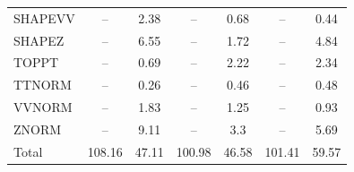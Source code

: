 \begin{table}[H]
\begin{center}
\begin{footnotesize}
\begin{tabular}{lcccccc}
				SHAPEVV & -- &  2.38 & -- &  0.68 & -- &  0.44 \\
				SHAPEZ & -- &  6.55 & -- &  1.72 & -- &  4.84 \\
				TOPPT & -- &  0.69 & -- &  2.22 & -- &  2.34 \\
				TTNORM & -- &  0.26 & -- &  0.46 & -- &  0.48 \\
				VVNORM & -- &  1.83 & -- &  1.25 & -- &  0.93 \\
				ZNORM & -- &  9.11 & -- &  3.3 & -- &  5.69 \\
				Total &  108.16  &  47.11 &  100.98  &  46.58 &  101.41  &  59.57 \\ \hline \hline
			\end{tabular}
			\label{tab:SysUncertainties_2800}
        \end{footnotesize}
	\end{center}
\end{table}


